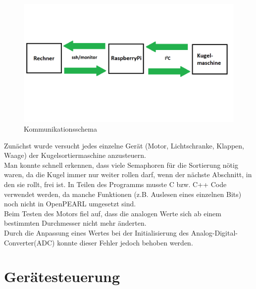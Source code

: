 \begin{figure}[h]
\begin{center}
\includegraphics[width=15cm]{grafiken/Kommunitations_schema.png}
\caption{Kommunikationsschema}
\label{Kommunikationsschema}
\end{center}
\end{figure}
\noindent
Zunächst wurde versucht jedes einzelne Gerät (Motor, Lichtschranke, Klappen, Waage) der Kugelsortiermaschine anzusteuern.\\
Man konnte schnell erkennen, dass viele Semaphoren für die Sortierung nötig waren, da die Kugel immer nur weiter rollen darf, wenn der nächste Abschnitt, in den sie rollt, frei ist.
In Teilen des Programms musste C bzw. C++ Code verwendet werden, da manche Funktionen (z.B. Auslesen eines einzelnen Bits) noch nicht in OpenPEARL umgesetzt sind.\\
Beim Testen des Motors fiel auf, dass die analogen Werte sich ab einem bestimmten Durchmesser nicht mehr änderten.\\ 
Durch die Anpassung eines Wertes bei der Initialisierung des Analog-Digital-Converter(ADC) konnte dieser Fehler jedoch behoben werden.\\
\newpage

\section{Gerätesteuerung}
